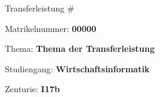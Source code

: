 \documentclass[../main.tex]{subfiles}
\begin{document}
\begin{titlepage}
\centering
{\Huge Transferleistung # \par}
\vspace{1.5cm}
{\LARGE Matrikelnummer: \textbf{00000}\par}
\vspace{1cm}
{\LARGE Thema: \textbf{Thema der Transferleistung}\par}
\vspace{1cm}
{\LARGE Studiengang: \textbf{Wirtschaftsinformatik}\par}
\vspace{1cm}
{\LARGE Zenturie: \textbf{I17b}\par}
\end{titlepage}
\end{document}

